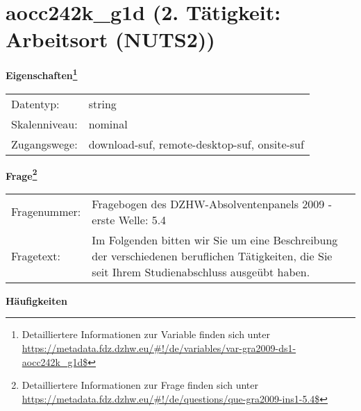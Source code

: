 
    \setcounter{footnote}{0}

    \vspace*{-1.8cm}
	\section{aocc242k\_g1d (2. Tätigkeit: Arbeitsort (NUTS2))}
	\label{section:aocc242k_g1d}



    \vspace*{0.5cm}
    \noindent\textbf{Eigenschaften\footnote{Detailliertere Informationen zur Variable finden sich unter
		\url{https://metadata.fdz.dzhw.eu/\#!/de/variables/var-gra2009-ds1-aocc242k_g1d$}}}\\
	\begin{tabularx}{\hsize}{@{}lX}
	Datentyp: & string \\
	Skalenniveau: & nominal \\
	Zugangswege: &
	  download-suf, 
	  remote-desktop-suf, 
	  onsite-suf
 \\
    \end{tabularx}



				\vspace*{0.5cm}
                \noindent\textbf{Frage\footnote{Detailliertere Informationen zur Frage finden sich unter
		              \url{https://metadata.fdz.dzhw.eu/\#!/de/questions/que-gra2009-ins1-5.4$}}}\\
				\begin{tabularx}{\hsize}{@{}lX}
					Fragenummer: &
					  Fragebogen des DZHW-Absolventenpanels 2009 - erste Welle:
					  5.4
 \\
					Fragetext: & Im Folgenden bitten wir Sie um eine Beschreibung der verschiedenen beruflichen Tätigkeiten, die Sie seit Ihrem Studienabschluss ausgeübt haben. \\
				\end{tabularx}





        		\vspace*{0.5cm}
                \noindent\textbf{Häufigkeiten}

